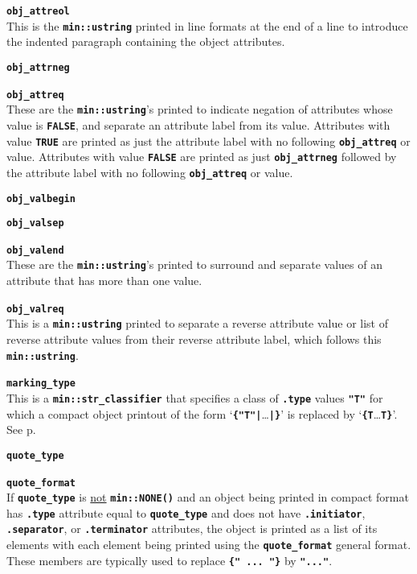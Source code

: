 \documentclass[12pt]{article}
\makeatletter
\newcommand{\TT}[1]{{\tt \bfseries #1}}
\newcommand{\ttmkey}[2]{\TT{#1}\index{#1@{\tt #1}!#2}}
\newcommand{\pagref}[1]{p\pageref{#1}}
\newcommand{\EOL}{\penalty \exhyphenpenalty}
\newenvironment{itemlist}[1][1.2in]%
	{\begin{list}{}{\setlength{\labelwidth}{#1}%
		        \setlength{\leftmargin}{\labelwidth}%
		        \addtolength{\leftmargin}{+0.2in}%
		        \renewcommand{\makelabel}[1]{##1\hfill}}}%
	{\end{list}}
\makeatother
\begin{document}
\begin{itemlist}[0.2in]
\item[\ttmkey{obj\_attreol}{in {\tt min::obj\_format}}]~\\
This is the \TT{min::ustring} printed in line formats at the end of a line
to introduce the indented paragraph containing the object attributes.

\item[\ttmkey{obj\_attrneg}{in {\tt min::obj\_format}}]
\item[\ttmkey{obj\_attreq}{in {\tt min::obj\_format}}]\vspace{-2ex}~\\
These are the \TT{min::ustring}'s printed to indicate
negation of attributes whose value is \TT{FALSE}, and
separate an attribute label from its value.
Attributes with value \TT{TRUE} are printed as just
the attribute label with no following \TT{obj\_\EOL attreq} or value.
Attributes with value \TT{FALSE} are printed as just
\TT{obj\_\EOL attrneg} followed by
the attribute label with no following \TT{obj\_\EOL attreq} or value.

\item[\ttmkey{obj\_valbegin}{in {\tt min::obj\_format}}]
\item[\ttmkey{obj\_valsep}{in {\tt min::obj\_format}}]\vspace{-2ex}
\item[\ttmkey{obj\_valend}{in {\tt min::obj\_format}}]\vspace{-2ex}~\\
These are the \TT{min::ustring}'s printed to surround and
separate values of an attribute that has more than one
value.

\item[\ttmkey{obj\_valreq}{in {\tt min::obj\_format}}]~\\
This is a \TT{min::ustring} printed to separate a reverse
attribute value or list of reverse attribute values from
their reverse attribute label, which follows this \TT{min::ustring}.

\item[\ttmkey{marking\_type}{in {\tt min::obj\_format}}]~\\
This is a \TT{min::str\_classifier} that specifies a class of
\TT{.type} values \TT{"T"} for which a compact object printout of the
form `\TT{\{"T"|}\ldots\TT{|\}}' is replaced by `\TT{\{T}\ldots\TT{T\}}'.
See \pagref{MARKING_TYPE}.

\item[\ttmkey{quote\_type}{in {\tt min::obj\_format}}]
\item[\ttmkey{quote\_format}{in {\tt min::obj\_format}}]\vspace{-2ex}~\\
If \TT{quote\_type} is \underline{not} \TT{min::NONE()} and
an object being printed in compact format has \TT{.type} attribute
equal to \TT{quote\_\EOL type} and does not have
\TT{.initiator}, \TT{.separator}, or \TT{.terminator} attributes,
the object is printed as a list of its elements with each element
being printed using the \TT{quote\_\EOL format} general format.
These members are typically used to replace \TT{\{"~...~"\}} by
\TT{"..."}.


\end{itemlist}
\end{document}

